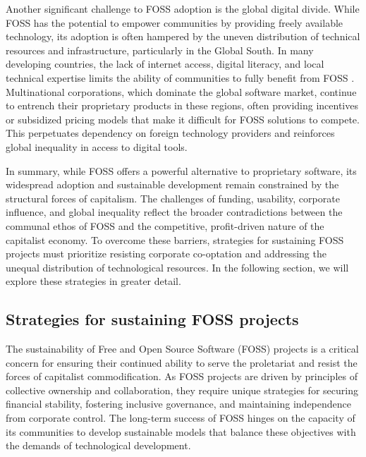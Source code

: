 \begin{refsection}
Another significant challenge to FOSS adoption is the global digital divide. While FOSS has the potential to empower communities by providing freely available technology, its adoption is often hampered by the uneven distribution of technical resources and infrastructure, particularly in the Global South. In many developing countries, the lack of internet access, digital literacy, and local technical expertise limits the ability of communities to fully benefit from FOSS \cite[pp.~104-106]{benkler2010}. Multinational corporations, which dominate the global software market, continue to entrench their proprietary products in these regions, often providing incentives or subsidized pricing models that make it difficult for FOSS solutions to compete. This perpetuates dependency on foreign technology providers and reinforces global inequality in access to digital tools.

In summary, while FOSS offers a powerful alternative to proprietary software, its widespread adoption and sustainable development remain constrained by the structural forces of capitalism. The challenges of funding, usability, corporate influence, and global inequality reflect the broader contradictions between the communal ethos of FOSS and the competitive, profit-driven nature of the capitalist economy. To overcome these barriers, strategies for sustaining FOSS projects must prioritize resisting corporate co-optation and addressing the unequal distribution of technological resources. In the following section, we will explore these strategies in greater detail.

\subsection{Strategies for sustaining FOSS projects}

The sustainability of Free and Open Source Software (FOSS) projects is a critical concern for ensuring their continued ability to serve the proletariat and resist the forces of capitalist commodification. As FOSS projects are driven by principles of collective ownership and collaboration, they require unique strategies for securing financial stability, fostering inclusive governance, and maintaining independence from corporate control. The long-term success of FOSS hinges on the capacity of its communities to develop sustainable models that balance these objectives with the demands of technological development.


\end{refsection}
